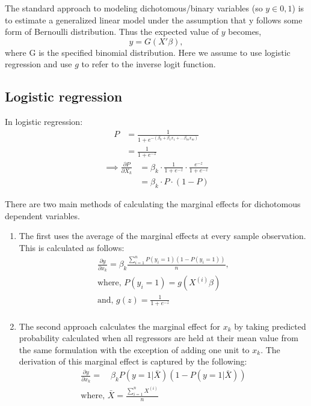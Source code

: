 The standard approach to modeling dichotomous/binary variables
(so $y \in {0, 1}$) is to estimate a generalized linear model under the
assumption that y follows some form of Bernoulli distribution. Thus the expected
value of $y$ becomes,
\begin{equation*}
    y = G(X' \beta),
  \end{equation*}
where G is the specified binomial distribution. Here we assume to use
logistic regression and use $g$ to refer to the inverse logit function.

\subsection{Logistic regression} %
\label{sub:logistic_regression}
In logistic regression:
\begin{align*}
  P &= \frac{1}{1 + e^{-(\beta_0 + \beta_1 x_1 + \dots  \beta_m x_m)}} \\
    &= \frac{1}{1 + e^{-z}}
\end{align*}
\begin{align*}
  \implies \frac{\partial P}{\partial X_k} &= \beta_k \cdot \frac{1}{1 + e^{-z}} \cdot
              \frac{e^{-z}}{1 + e^{-z}} \\
      &= \beta_k \cdot P \cdot (1-P)
\end{align*}


There are two main methods of calculating the marginal effects for dichotomous
dependent variables.
\begin{enumerate}
  \item The first uses the average of the marginal effects at every sample
  observation. This is calculated as follows:
  \begin{gather*}
    \frac{\partial y}{\partial x_k} = \beta_k \frac{\sum_{i=1}^{n} P(y_i = 1)(1-P(y_i = 1))}{n}, \\
    \text{where, } P(y_i=1) = g(X^{(i)} \beta) \\
    \text{and, } g(z) = \frac{1}{1 + e^{-z}} \\
  \end{gather*}

  \item The second approach calculates the marginal effect for $x_k$ by taking
    predicted probability calculated when all regressors are held at their mean
    value from the same formulation with the exception of adding one unit to $x_k$.
    The derivation of this marginal effect is captured by the following:
    \begin{gather*}
      \frac{\partial y}{\partial x_k} = \quad \beta_k P(y=1|\bar{X})(1-P(y=1|\bar{X})) \\
      \text{where, } \bar{X} = \frac{\sum_{i=1}^{n}X^{(i)}}{n}
    \end{gather*}
\end{enumerate}

